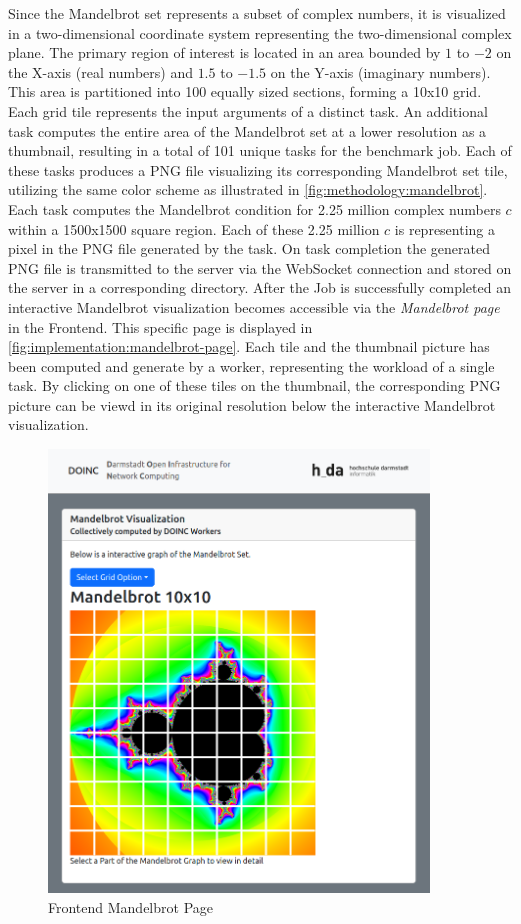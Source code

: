 Since the Mandelbrot set represents a subset of complex numbers, it is visualized in a two-dimensional coordinate system representing the two-dimensional complex plane. The primary region of interest is located in an area bounded by $1$ to $-2$ on the X-axis (real numbers) and $1.5$ to $-1.5$ on the Y-axis (imaginary numbers). This area is partitioned into 100 equally sized sections, forming a 10x10 grid. Each grid tile represents the input arguments of a distinct task. An additional task computes the entire area of the Mandelbrot set at a lower resolution as a thumbnail, resulting in a total of 101 unique tasks for the benchmark job. Each of these tasks produces a \ac{PNG} file visualizing its corresponding Mandelbrot set tile, utilizing the same color scheme as illustrated in \autoref{fig:methodology:mandelbrot}. Each task computes the Mandelbrot condition for 2.25 million complex numbers $c$ within a 1500x1500 square region. Each of these 2.25 million $c$ is representing a pixel in the \ac{PNG} file generated by the task. On task completion the generated \ac{PNG} file is transmitted to the server via the WebSocket connection and stored on the server in a corresponding directory. After the Job is successfully completed an interactive Mandelbrot visualization becomes accessible via the \emph{Mandelbrot page} in the Frontend. This specific page is displayed in \autoref{fig:implementation:mandelbrot-page}. Each tile and the thumbnail picture has been computed and generate by a worker, representing the workload of a single task. By clicking on one of these tiles on the thumbnail, the corresponding \ac{PNG} picture can be viewd in its original resolution below the interactive Mandelbrot visualization.
\begin{figure}[htbp]
    \centering
    \includegraphics[width=0.9\textwidth]{gfx/figures/mandelbrot-page.png}
    \caption{Frontend Mandelbrot Page}
    \label{fig:implementation:mandelbrot-page}
\end{figure}
